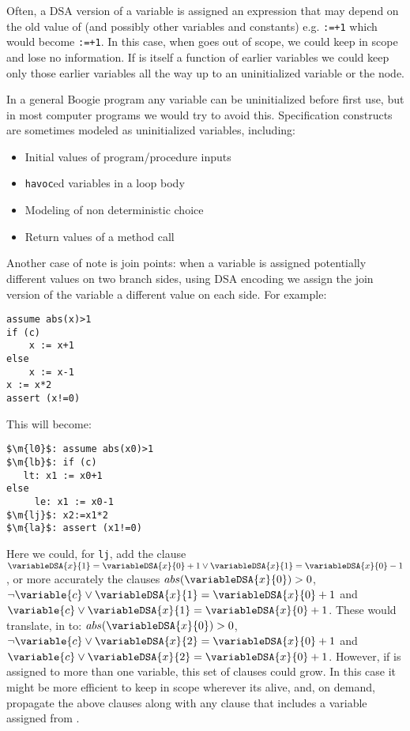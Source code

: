 Often, a DSA version of a variable  is assigned an expression that may depend on the old value of  (and possibly other variables and constants) e.g. \lstinline{:=}\lstinline{+1} which would become \lstinline{:=}\lstinline{+1}.
In this case, when  goes out of scope, we could keep  in scope and lose no information. If  is itself a function of earlier variables we could keep only those earlier variables all the way up to an uninitialized variable or the  node.

In a general Boogie program any variable can be uninitialized before first use, but in most computer programs we would try to avoid this. Specification constructs are sometimes modeled as uninitialized variables, including:
\begin{itemize}
	\item Initial values of program/procedure inputs
	\item \lstinline{havoc}ed variables in a loop body
	\item Modeling of non deterministic choice
	\item Return values of a method call
\end{itemize}

Another case of note is join points: when a variable is assigned potentially different values on two branch sides, using DSA encoding we assign the join version of the variable a different value on each side. For example:
\begin{lstlisting}[caption=DSA conversion,label=snippet3.5.6]
assume abs(x)>1
if (c)
	x := x+1
else
	x := x-1
x := x*2
assert (x!=0)
\end{lstlisting}

This will become:
\begin{lstlisting}[caption=DSA conversion,label=snippet3.5.6a]
$\m{l0}$: assume abs(x0)>1
$\m{lb}$: if (c)
   lt: x1 := x0+1
else
	 le: x1 := x0-1
$\m{lj}$: x2:=x1*2
$\m{la}$: assert (x1!=0)
\end{lstlisting}

Here we could, for \lstinline{lj}, add the clause $\variableDSA{x}{1}=\variableDSA{x}{0}+1 \lor \variableDSA{x}{1}=\variableDSA{x}{0}-1$, or more accurately the clauses $abs(\variableDSA{x}{0})>0$, $\lnot \variable{c} \lor \variableDSA{x}{1}=\variableDSA{x}{0}+1$ and $ \variable{c} \lor \variableDSA{x}{1}=\variableDSA{x}{0}+1$.
These would translate, in  to: $abs(\variableDSA{x}{0})>0$, $\lnot \variable{c} \lor \variableDSA{x}{2}=\variableDSA{x}{0}+1$ and $ \variable{c} \lor \variableDSA{x}{2}=\variableDSA{x}{0}+1$.
However, if  is assigned to more than one variable, this set of clauses could grow.
In this case it might be more efficient to keep  in scope wherever its alive, and, on demand, propagate the above clauses along with any clause that includes a variable assigned from .

